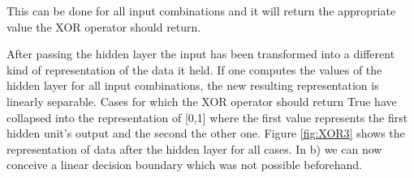 This can be done for all input combinations and it will return the appropriate value the XOR operator should return. 

After passing the hidden layer the input has been transformed into a different kind of representation of the data it held. 
If one computes the values of the hidden layer for all input combinations, the new resulting representation is linearly separable. 
Cases for which the XOR operator should return True have collapsed into the representation of [0,1] where the first value represents the first hidden unit's output and the second the other one. 
Figure \ref{fig:XOR3} shows the representation of data after the hidden layer for all cases. 
In b) we can now conceive a linear decision boundary which was not possible beforehand.

